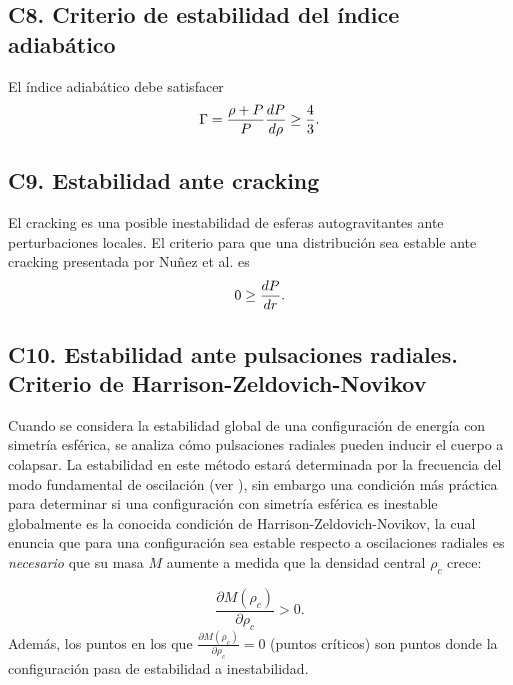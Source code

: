 \subsection*{C8. Criterio de estabilidad del índice adiabático }
El índice adiabático debe satisfacer
\begin{equation}
    \Gamma = \frac { \rho + P  } { P } \dv{P}{\rho} \geq \frac{4}{3}.
\end{equation}

\subsection*{C9. Estabilidad ante cracking}
El cracking es una posible inestabilidad de esferas autogravitantes ante perturbaciones locales. El criterio para que una distribución sea estable ante cracking presentada por Nuñez et al. \cite{Hernandez2018} es
\begin{equation}
    0 \geq \dv{P}{r}.
\end{equation}

\subsection*{C10. Estabilidad ante pulsaciones radiales. Criterio de Harrison-Zeldovich-Novikov}
Cuando se considera la estabilidad global de una configuraci\'on de energía con simetría esférica, se analiza cómo pulsaciones radiales pueden inducir el cuerpo a colapsar. La estabilidad en este método estará determinada por la frecuencia del modo fundamental de oscilación (ver \cite{Haensel2007NeutronStructure,Shapiro1983}), sin embargo una condición más práctica para determinar si una configuraci\'on con simetría esférica es inestable globalmente es la conocida condición de Harrison-Zeldovich-Novikov, la cual enuncia que para una configuración sea estable respecto a oscilaciones radiales es \emph{necesario} que su masa $M$ aumente a medida que la densidad central $\rho_{c}$ crece: 

\begin{equation}
    \frac { \partial M \left( \rho _ { c } \right) } { \partial \rho _ { c } } > 0.
\end{equation}
Además, los puntos en los que $\frac { \partial M \left( \rho _ { c } \right) } { \partial \rho _ { c } } = 0$ (puntos críticos) son puntos donde la configuraci\'on pasa de estabilidad a inestabilidad.



